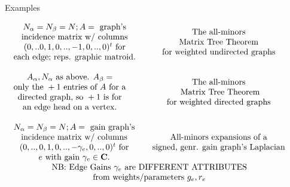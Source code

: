 \documentclass{beamer}
\begin{document}
\begin{frame}{Examples}
  
 \hspace*{-0.25in}$
  \begin{array}{lc}
    \begin{array}{c}
      N_\alpha=N_\beta=N; A = \text{\ graph's}\\
      \text{incidence matrix w/ columns}\\
      (0,..0,1,0,..,-1,0,..,0)^t\text{ for}\\
      \text{each edge; reps. graphic matroid.}
    \end{array}
    &
    \begin{array}{c}
      \text{The all-minors}\\
      \text{Matrix Tree Theorem}\\
    \text{for weighted undirected graphs}
    \end{array}
    \\ \\
    \begin{array}{c}
      A_\alpha, N_\alpha \text{ as above. }A_\beta=\\
      \text{only the\ } +1\text{\ entries of\ }A\text{ for a}\\
      \text{directed graph, so }+1\text{\ is for}\\
      \text{an edge head on a vertex.}\\
    \end{array}
    &
    \begin{array}{c}
      \text{The all-minors}\\
      \text{ Matrix Tree Theorem} \\
    \text{for weighted directed graphs}
    \end{array}
  \\ \\
    \begin{array}{c}
      N_\alpha=N_\beta=N; A = \text{\ gain graph's}\\
      \text{incidence matrix w/ columns}\\
      (0,..,0,1,0,..,-\gamma_e,0,..,0)^t\text{ for}\\
      e\text{ with gain } \gamma_e \in \mathbf{C}.
    \end{array}
    &
    \begin{array}{c}
      \text{All-minors expansions of a}\\
      \text{signed, genr. gain graph's Laplacian}
    \end{array}\\
    \multicolumn{2}{c}{\text{NB: Edge Gains\ }\gamma_e\text{\ are DIFFERENT ATTRIBUTES}}\\
    \multicolumn{2}{c}{\text{from weights/parameters\ }g_e,r_e}
  \end{array}
  $
\end{frame}
\end{document}
